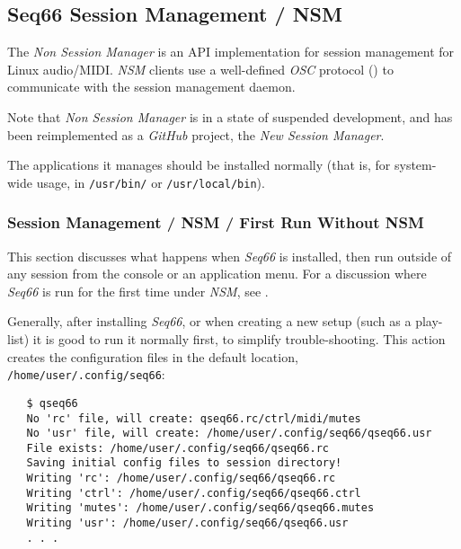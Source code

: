 
\subsection{Seq66 Session Management / NSM}
\label{subsec:sessions_nsm}

   The \textsl{Non Session Manager} is an API implementation for session
   management for Linux audio/MIDI.
   \textsl{NSM} clients use a well-defined
   \textsl{OSC} protocol (\cite{osc})
   to communicate with the session management daemon.

   Note that \textsl{Non Session Manager} is in a state of suspended
   development, and has been reimplemented as a \textsl{GitHub} project,
   the \textsl{New Session Manager}.

   The applications it manages should be installed normally (that is,
   for system-wide usage, in
   \texttt{/usr/bin/} or \texttt{/usr/local/bin}).

\subsubsection{Session Management / NSM / First Run Without NSM}
\label{subsec:sessions_nsm_first_run_without_nsm}

   This section discusses what happens when \textsl{Seq66} is installed, then
   run outside of any session from the console or an application menu.
   For a discussion where \textsl{Seq66} is run for the first time under
   \textsl{NSM},
   see .

   Generally, after installing \textsl{Seq66}, or when creating a new setup
   (such as a play-list) it is good to run it normally first, to simplify
   trouble-shooting.
   This action creates the configuration files in the default location,
   \texttt{/home/user/.config/seq66}:

\begin{verbatim}
   $ qseq66 
   No 'rc' file, will create: qseq66.rc/ctrl/midi/mutes
   No 'usr' file, will create: /home/user/.config/seq66/qseq66.usr
   File exists: /home/user/.config/seq66/qseq66.rc
   Saving initial config files to session directory!
   Writing 'rc': /home/user/.config/seq66/qseq66.rc
   Writing 'ctrl': /home/user/.config/seq66/qseq66.ctrl
   Writing 'mutes': /home/user/.config/seq66/qseq66.mutes
   Writing 'usr': /home/user/.config/seq66/qseq66.usr
   . . .
\end{verbatim}

